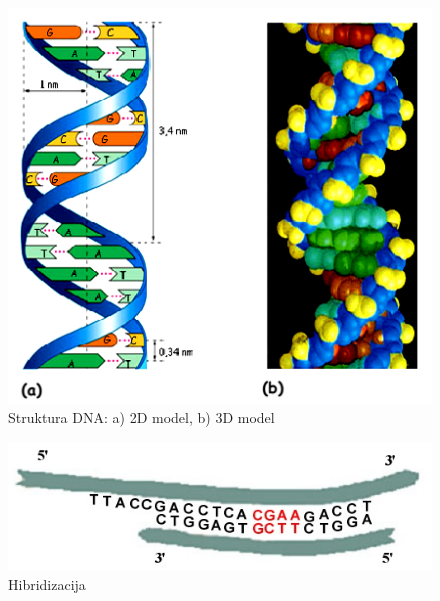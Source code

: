 \documentclass[a4paper,oneside,12pt]{memoir} %
\begin{document}
\begin{spacing}{1.5}
\begin{figure}[h!t]
\centering \includegraphics[scale=0.8]{DNA.png}
\caption{Struktura DNA: a) 2D model, b) 3D model}
\label{fig:DNA}
\end{figure}

\begin{figure}[h!t]
\centering \includegraphics[scale=0.8]{hybrid.jpg}
\caption{Hibridizacija}
\label{fig:hybrid}
\end{figure}


\end{spacing}
\end{document}
